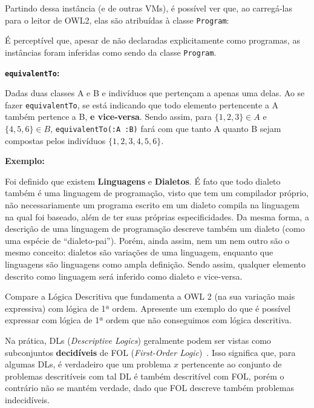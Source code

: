 \documentclass[answers]{exam}
\newcommand{\result}[2]{\textfile[firstline=#1, lastline=#2]{thesampleoutput}}
\begin{document}
\begin{questions}
\begin{answer}
            Partindo dessa instância (e de outras VMs), é possível ver que, ao
            carregá-las para o leitor de OWL2, elas são atribuídas à classe
            \texttt{Program}:

            \result{15}{17}

            É perceptível que, apesar de não declaradas explicitamente como
            programas, as instâncias foram inferidas como sendo da classe
            \texttt{Program}.

            \textbf{\texttt{equivalentTo}:}

            Dadas duas classes A e B e indivíduos que pertençam a apenas uma
            delas. Ao se fazer \texttt{equivalentTo}, se está indicando que
            todo elemento pertencente a A também pertence a B, \textbf{e
            vice-versa}.  Sendo assim, para $\{1, 2, 3\} \in A$ e $\{4, 5, 6\}
            \in B$, \texttt{equivalentTo(:A :B)} fará com que tanto A quanto B
            sejam compostas pelos indivíduos $\{1, 2, 3, 4, 5, 6\}$.

            \textbf{Exemplo:}

            Foi definido que existem \textbf{Linguagens} e \textbf{Dialetos}. É
            fato que todo dialeto também é uma linguagem de programação, visto
            que tem um compilador próprio, não necessariamente um programa
            escrito em um dialeto compila na linguagem na qual foi baseado,
            além de ter suas próprias especificidades. Da mesma forma, a
            descrição de uma linguagem de programação descreve também um
            dialeto (como uma espécie de ``dialeto-pai''). Porém, ainda assim,
            nem um nem outro são o mesmo conceito: dialetos são variações de
            uma linguagem, enquanto que linguagens são linguagens como ampla
            definição.  Sendo assim, qualquer elemento descrito como linguagem
            será inferido como dialeto e vice-versa.
        \end{answer}

        \question{}
        Compare a Lógica Descritiva que fundamenta a OWL 2 (na sua variação
        mais expressiva) com lógica de 1ª ordem. Apresente um exemplo do que é
        possível expressar com lógica de 1ª ordem que não conseguimos com
        lógica descritiva.

        \begin{answer}
            Na prática, DLs (\textit{Descriptive Logics}) geralmente podem ser
            vistas como subconjuntos \textbf{decidíveis} de FOL
            (\textit{First-Order Logic})~\cite{tsarkov:2003}. Isso significa
            que, para algumas DLs, é verdadeiro que um problema $x$ pertencente
            ao conjunto de problemas descritíveis com tal DL é também
            descritível com FOL, porém o contrário não se mantém verdade, dado
            que FOL descreve também problemas indecidíveis.


\end{answer}
\end{questions}
\end{document}
